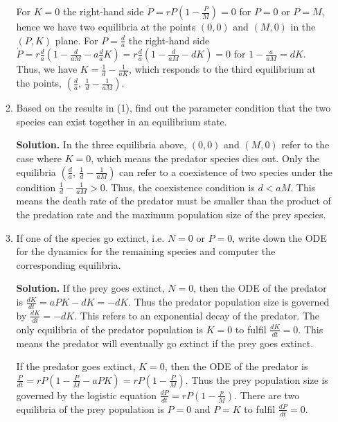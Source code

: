\documentclass[11pt,a4paper]{article}
\begin{document}
\begin{enumerate}[\bfseries A.]
\begin{enumerate}[\bfseries 1)]
			For $K = 0$ the right-hand side $\dot{P} = rP(1-\frac{P}{M}) = 0$ for $P = 0$ or $P = M$, hence we have two equilibria at the points $(0, 0)$ and $(M, 0)$ in the $(P, K)$ plane. For $P = \frac{d}{a}$ the right-hand side $\dot{P} = r\frac{d}{a}(1-\frac{d}{aM}-a\frac{d}{a}K) = r\frac{d}{a}(1-\frac{d}{aM}-dK) = 0$ for $1-\frac{a}{aM} = dK$. Thus, we have $K = \frac{1}{d}-\frac{1}{aK}$, which responds to the third equilibrium at the points, $(\frac{d}{a},\ \frac{1}{d}-\frac{1}{aM})$.
			\item Based on the results in (1), find out the parameter condition that the two species can exist together in an equilibrium state.\par
			\textbf{Solution.} In the three equilibria above, $(0, 0)$ and $(M, 0)$ refer to the case where $K = 0$, which means the predator species dies out. Only the equilibria $(\frac{d}{a},\ \frac{1}{d}-\frac{1}{aM})$ can refer to a coexistence of two species under the condition $\frac{1}{d}-\frac{1}{aM}>0$. Thus, the coexistence condition is $d < aM$. This means the death rate of the predator must be smaller than the product of the predation rate and the maximum population size of the prey species.
			\item If one of the species go extinct, i.e. $N = 0$ or $P = 0$, write down the ODE for the dynamics for the remaining species and computer the corresponding equilibria.\par
			\textbf{Solution.} If the prey goes extinct, $N = 0$, then the ODE of the predator is $\frac{dK}{dt} = aPK-dK = -dK$. Thus the predator population size is governed by $\frac{dK}{dt} = -dK$. This refers to an exponential decay of the predator. The only equilibria of the predator population is $K = 0$ to fulfil $\frac{dK}{dt} = 0$. This means the predator will eventually go extinct if the prey goes extinct.\par
			If the predator goes extinct, $K = 0$, then the ODE of the predator is $\frac{P}{dt} = rP(1-\frac{P}{M}-aPK) = rP(1-\frac{P}{M})$. Thus the prey population size is governed by the logistic equation $\frac{dP}{dt} = rP(1-\frac{p}{M})$. There are two equilibria of the prey population is $P = 0$ and $P = K$ to fulfil $\frac{dP}{dt} = 0$.
		\end{enumerate}
	\end{enumerate}
\end{document}
